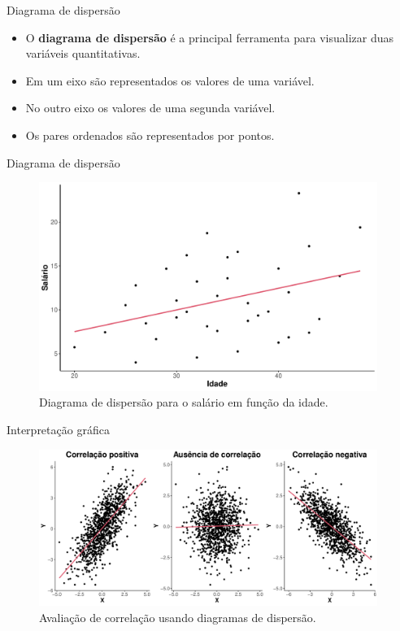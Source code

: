 \documentclass[
  ignorenonframetext,
  serif,
  professionalfont,
  usenames,
  dvipsnames,
  aspectratio = 169]{beamer}
\begin{document}
\begin{frame}{Diagrama de dispersão}
\label{diagrama-de-dispersuxe3o}
\begin{itemize}
\item
  O \textbf{diagrama de dispersão} é a principal ferramenta para
  visualizar duas variáveis quantitativas.
\item
  Em um eixo são representados os valores de uma variável.
\item
  No outro eixo os valores de uma segunda variável.
\item
  Os pares ordenados são representados por pontos.
\end{itemize}
\end{frame}

\begin{frame}{Diagrama de dispersão}
\label{diagrama-de-dispersuxe3o-1}
\begin{figure}

{\centering \includegraphics[width=11cm]{encontro2_files/figure-beamer/unnamed-chunk-32-1} 

}

\caption{Diagrama de dispersão para o salário em função da idade.}\label{fig:unnamed-chunk-32}
\end{figure}
\end{frame}

\begin{frame}{Interpretação gráfica}
\label{interpretauxe7uxe3o-gruxe1fica}
\begin{figure}

{\centering \includegraphics[width=11cm]{encontro2_files/figure-beamer/unnamed-chunk-33-1} 

}

\caption{Avaliação de correlação usando diagramas de dispersão.}\label{fig:unnamed-chunk-33}
\end{figure}
\end{frame}
\end{document}
